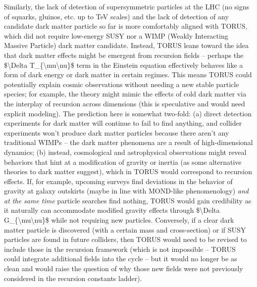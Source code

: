 \documentclass[
]{article}
\begin{document}
Similarly, the lack of detection of supersymmetric particles at the LHC
(no signs of squarks, gluinos, etc. up to TeV scales) and the lack of
detection of any candidate dark matter particle so far is more
comfortably aligned with TORUS, which did not require low-energy SUSY
nor a WIMP (Weakly Interacting Massive Particle) dark matter candidate.
Instead, TORUS leans toward the idea that dark matter effects might be
emergent from recursion fields -- perhaps the \$\textbackslash Delta
T\_\{\textbackslash mu\textbackslash nu\}\$ term in the Einstein
equation effectively behaves like a form of dark energy or dark matter
in certain regimes. This means TORUS could potentially explain cosmic
observations without needing a new stable particle species; for example,
the theory might mimic the effects of cold dark matter via the interplay
of recursion across dimensions (this is speculative and would need
explicit modeling). The prediction here is somewhat two-fold: (a) direct
detection experiments for dark matter will continue to fail to find
anything, and collider experiments won't produce dark matter particles
because there aren't any traditional WIMPs -- the dark matter phenomena
are a result of high-dimensional dynamics; (b) instead, cosmological and
astrophysical observations might reveal behaviors that hint at a
modification of gravity or inertia (as some alternative theories to dark
matter suggest), which in TORUS would correspond to recursion effects.
If, for example, upcoming surveys find deviations in the behavior of
gravity at galaxy outskirts (maybe in line with MOND-like phenomenology)
\emph{and at the same time} particle searches find nothing, TORUS would
gain credibility as it naturally can accommodate modified gravity
effects through \$\textbackslash Delta
G\_\{\textbackslash mu\textbackslash nu\}\$ while not requiring new
particles. Conversely, if a clear dark matter particle is discovered
(with a certain mass and cross-section) or if SUSY particles are found
in future colliders, then TORUS would need to be revised to include
those in the recursion framework (which is not impossible -- TORUS could
integrate additional fields into the cycle -- but it would no longer be
as clean and would raise the question of why those new fields were not
previously considered in the recursion constants ladder).
\end{document}

